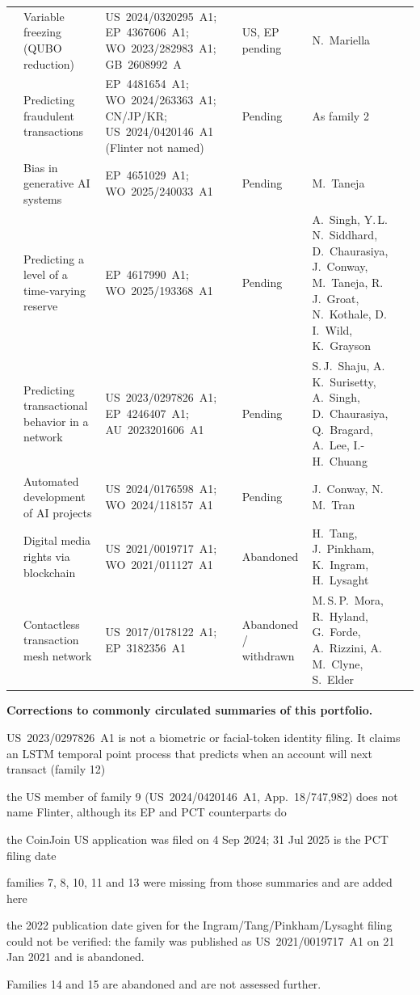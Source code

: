 \documentclass[10pt,a4paper]{article}
\begin{document}
\begin{longtable}{>{\raggedright\arraybackslash}p{0.35cm}>{\raggedright\arraybackslash}p{3.4cm}>{\raggedright\arraybackslash}p{5.0cm}>{\raggedright\arraybackslash}p{2.3cm}>{\raggedright\arraybackslash}p{3.85cm}}
8 & Variable freezing (QUBO reduction) & US~2024/0320295~A1; EP~4367606~A1; WO~2023/282983~A1; GB~2608992~A & US, EP pending & N.~Mariella \\
9 & Predicting fraudulent transactions & EP~4481654~A1; WO~2024/263363~A1; CN/JP/KR; US~2024/0420146~A1 (Flinter not named) & Pending & As family 2 \\
10 & Bias in generative AI systems & EP~4651029~A1; WO~2025/240033~A1 & Pending & M.~Taneja \\
11 & Predicting a level of a time-varying reserve & EP~4617990~A1; WO~2025/193368~A1 & Pending & A.~Singh, Y.\,L.\,N.~Siddhard, D.~Chaurasiya, J.~Conway, M.~Taneja, R.\,J.~Groat, N.~Kothale, D.\,I.~Wild, K.~Grayson \\
12 & Predicting transactional behavior in a network & US~2023/0297826~A1; EP~4246407~A1; AU~2023201606~A1 & Pending & S.\,J.~Shaju, A.\,K.~Surisetty, A.~Singh, D.~Chaurasiya, Q.~Bragard, A.~Lee, I.-H.~Chuang \\
13 & Automated development of AI projects & US~2024/0176598~A1; WO~2024/118157~A1 & Pending & J.~Conway, N.\,M.~Tran \\
14 & Digital media rights via blockchain & US~2021/0019717~A1; WO~2021/011127~A1 & Abandoned & H.~Tang, J.~Pinkham, K.~Ingram, H.~Lysaght \\
15 & Contactless transaction mesh network & US~2017/0178122~A1; EP~3182356~A1 & Abandoned / withdrawn & M.\,S.\,P.~Mora, R.~Hyland, G.~Forde, A.~Rizzini, A.\,M.~Clyne, S.~Elder \\
\bottomrule
\end{longtable}
\endgroup
\noindent\textbf{Corrections to commonly circulated summaries of this portfolio.}
\begin{enumerate*}[label=(\roman*),itemjoin={{; }}]
\item US~2023/0297826~A1 is not a biometric or facial-token identity filing. It claims an LSTM temporal point process that predicts when an account will next transact (family 12)
\item the US member of family 9 (US~2024/0420146~A1, App.\ 18/747,982) does not name Flinter, although its EP and PCT counterparts do
\item the CoinJoin US application was filed on 4 Sep 2024; 31 Jul 2025 is the PCT filing date
\item families 7, 8, 10, 11 and 13 were missing from those summaries and are added here
\item the 2022 publication date given for the Ingram/Tang/Pinkham/Lysaght filing could not be verified: the family was published as US~2021/0019717~A1 on 21 Jan 2021 and is abandoned.
\end{enumerate*}
Families 14 and 15 are abandoned and are not assessed further.
\end{document}
